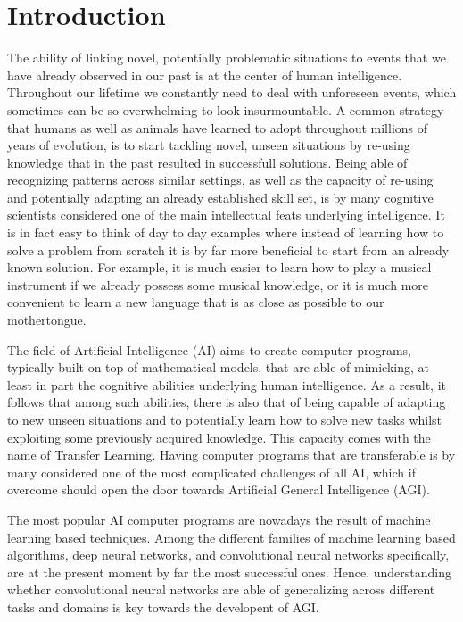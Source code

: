\chapter*{Introduction}
\label{ch:introduction}

The ability of linking novel, potentially problematic situations to events that we have already observed in our past is at the center of human intelligence. Throughout our lifetime we constantly need to deal with unforeseen events, which sometimes can be so overwhelming to look insurmountable. A common strategy that humans as well as animals have learned to adopt throughout millions of years of evolution, is to start tackling novel, unseen situations by re-using knowledge that in the past resulted in successfull solutions. Being able of recognizing patterns across similar settings, as well as the capacity of re-using and potentially adapting an already established skill set, is by many cognitive scientists considered one of the main intellectual feats underlying intelligence. It is in fact easy to think of day to day examples where instead of learning how to solve a problem from scratch it is by far more beneficial to start from an already known solution. For example, it is much easier to learn how to play a musical instrument if we already possess some musical knowledge, or it is much more convenient to learn a new language that is as close as possible to our mothertongue.

The field of Artificial Intelligence (AI) aims to create computer programs, typically built on top of mathematical models, that are able of mimicking, at least in part the cognitive abilities underlying human intelligence. As a result, it follows that among such abilities, there is also that of being capable of adapting to new unseen situations and to potentially learn how to solve new tasks whilst exploiting some previously acquired knowledge. This capacity comes with the name of Transfer Learning. Having computer programs that are transferable is by many considered one of the most complicated challenges of all AI, which if overcome should open the door towards Artificial General Intelligence (AGI). 

The most popular AI computer programs are nowadays the result of machine learning based techniques. Among the different families of machine learning based algorithms, deep neural networks, and convolutional neural networks specifically, are at the present moment by far the most successful ones. Hence, understanding whether convolutional neural networks are able of generalizing across different tasks and domains is key towards the developent of AGI. 

